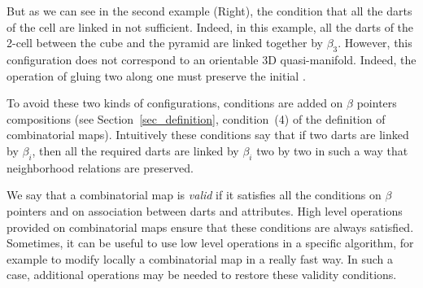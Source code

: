 But as we can see in the second example (Right), the condition that
all the darts of the cell are linked in not sufficient. Indeed, in
this example, all the darts of the 2-cell between the cube and the
pyramid are linked together by $\beta_3$. However, this configuration
does not correspond to an orientable 3D quasi-manifold. Indeed, the
operation of gluing two  along one  must
preserve the initial .

To avoid these two kinds of configurations, conditions are added on
$\beta$ pointers compositions (see Section~\ref{sec_definition},
condition~(4) of the definition of combinatorial maps). Intuitively
these conditions say that if two darts are linked by $\beta_i$, then
all the required darts are linked by $\beta_i$ two by two in such a
way that neighborhood relations are preserved.


We say that a combinatorial map is \emph{valid} if it satisfies all
the conditions on $\beta$ pointers and on association between darts
and attributes.  High level operations provided on combinatorial maps
ensure that these conditions are always satisfied. Sometimes, it can
be useful to use low level operations in a specific algorithm, for
example to modify locally a combinatorial map in a really fast way. In
such a case, additional operations may be needed to restore these
validity conditions.

%







